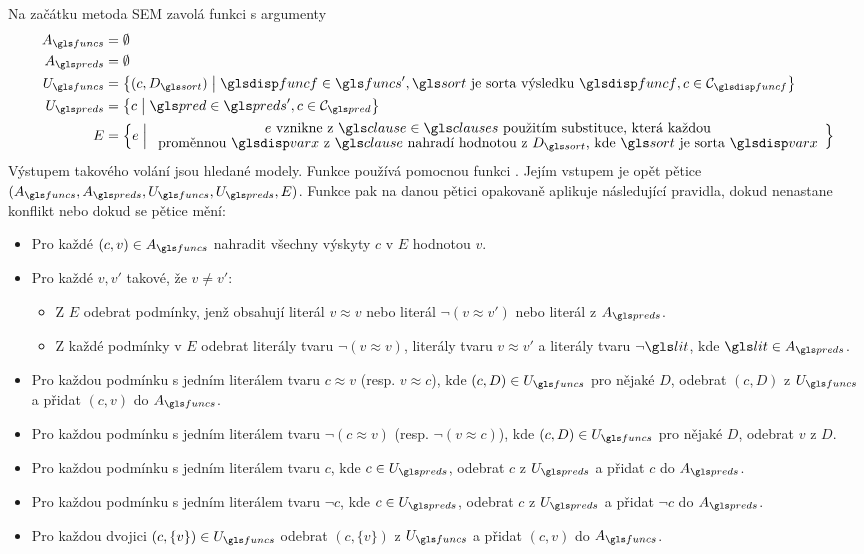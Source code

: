 Na začátku metoda SEM zavolá funkci  s argumenty
\begin{align*}
A_\funcs &= \emptyset \\
A_\preds &= \emptyset \\
U_\funcs &=
  \bigl\{ (c, D_\sort) \bigm|
    \func \in \funcs',
    \sort \text{ je sorta výsledku } \func,
    c \in \cells_\func \bigr\} \\
U_\preds &=
  \bigl\{ c \bigm|
    \pred \in \preds',
    c \in \cells_\pred \bigr\} \\
E &=
  \Bigl\{ e \Bigm|
    \array{c}
        e \text{ vznikne z $\clause \in \clauses$ použitím substituce,
                která každou} \\[-0.3ex]
      \text{proměnnou $\var$ z $\clause$ nahradí hodnotou z $D_\sort$, kde $\sort$
            je sorta $\var$}
    \endarray
    \Bigr\}
\end{align*}
Výstupem takového volání jsou hledané modely.
Funkce  používá pomocnou funkci .
Jejím vstupem je opět pětice
$(A_\funcs, A_\preds, U_\funcs, U_\preds, E)$.
Funkce  pak na danou pětici opakovaně
aplikuje ná\-sle\-du\-jící pravidla, dokud nenastane konflikt nebo
dokud se pětice mění:
\begin{itemize}
\item Pro každé $(c, v) \in A_\funcs$ nahradit všechny výskyty $c$ v $E$
  hodnotou $v$.
\item Pro každé $v, v'$ takové, že $v \neq v'$:
  \begin{itemize}
  \item Z $E$ odebrat podmínky, jenž obsahují literál $v \approx v$
    nebo literál $\neg (v \approx v')$ nebo literál z $A_\preds$.
  \item Z každé podmínky v $E$ odebrat literály tvaru $\neg (v \approx v)$,
    literály tvaru $v \approx v'$ a literály tvaru $\neg \lit$,
    kde $\lit \in A_\preds$.
  \end{itemize}
\item Pro každou podmínku s jedním literálem tvaru $c \approx v$
  (resp. $v \approx c$),
  kde $(c, D) \in U_\funcs$ pro nějaké $D$,
  odebrat $(c, D)$ z $U_\funcs$
  a přidat $(c, v)$ do $A_\funcs$.
\item Pro každou podmínku s jedním literálem tvaru $\neg (c \approx v)$
  (resp. $\neg (v \approx c)$),
  kde $(c, D) \in U_\funcs$ pro nějaké $D$,
  odebrat $v$ z $D$.
\item Pro každou podmínku s jedním literálem tvaru $c$,
  kde $c \in U_\preds$,
  odebrat $c$ z $U_\preds$
  a přidat $c$ do $A_\preds$.
\item Pro každou podmínku s jedním literálem tvaru $\neg c$,
  kde $c \in U_\preds$,
  odebrat $c$ z $U_\preds$
  a přidat $\neg c$ do $A_\preds$.
\item Pro každou dvojici $(c, \{ v \}) \in U_\funcs$
  odebrat $(c, \{ v \})$ z $U_\funcs$
  a přidat $(c, v)$ do $A_\funcs$.
\end{itemize}

